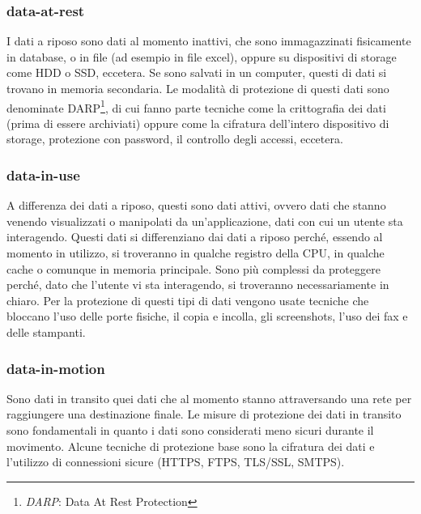     \subsubsection{data-at-rest}
        I dati a riposo sono dati al momento inattivi, che sono immagazzinati fisicamente in database,
        o in file (ad esempio in file excel), oppure su dispositivi di storage come HDD o SSD, eccetera.
        Se sono salvati in un computer, questi di dati si trovano in memoria secondaria.
        Le modalità di protezione di questi dati sono denominate DARP\footnote{\textit{DARP}: Data At Rest Protection}, 
        di cui fanno parte tecniche come la crittografia dei dati (prima di essere archiviati) oppure come la cifratura
        dell'intero dispositivo di storage, protezione con password, il controllo degli accessi, eccetera.

    \subsubsection{data-in-use}
        A differenza dei dati a riposo, questi sono dati attivi, ovvero dati che stanno venendo
        visualizzati o manipolati da un'applicazione, dati con cui un utente sta interagendo. 
        Questi dati si differenziano dai dati a riposo perché, essendo al momento in utilizzo, 
        si troveranno in qualche registro della CPU, in qualche cache 
        o comunque in memoria principale. Sono più complessi da proteggere perché, dato che l'utente vi sta
        interagendo, si troveranno necessariamente in chiaro. Per la protezione di questi tipi di dati
        vengono usate tecniche che bloccano l'uso delle porte fisiche, il copia e incolla, gli screenshots, l'uso dei fax
        e delle stampanti.

    \subsubsection{data-in-motion}
        Sono dati in transito quei dati che al momento stanno attraversando una rete per raggiungere 
        una destinazione finale. Le misure di protezione dei dati in transito sono fondamentali in quanto
        i dati sono considerati meno sicuri durante il movimento.
        Alcune tecniche di protezione base sono la cifratura dei dati
        e l'utilizzo di connessioni sicure (HTTPS, FTPS, TLS/SSL, SMTPS).

